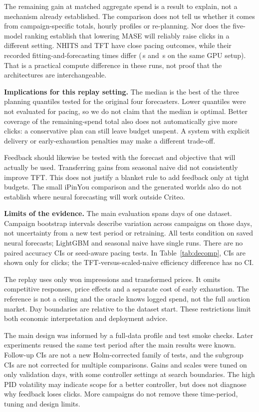\documentclass[sigconf,nonacm]{acmart}
\begin{document}
The remaining gain at matched aggregate spend is a result to explain, not a
mechanism already established. The comparison does not tell us whether it
comes from campaign-specific totals, hourly profiles or re-planning. Nor does
the five-model ranking establish that lowering MASE will reliably raise
clicks in a different setting. NHITS and TFT have close pacing outcomes,
while their recorded fitting-and-forecasting times differ
(\,s and \,s on the same GPU setup).
That is a practical compute difference in these runs, not proof that the
architectures are interchangeable.

\textbf{Implications for this replay setting.} The median is the best of the
three planning quantiles tested for the original four forecasters. Lower
quantiles were not evaluated for pacing, so we do not claim that the median
is optimal. Better coverage of the remaining-spend total also does not
automatically give more clicks: a conservative plan can still leave budget
unspent. A system with explicit delivery or early-exhaustion penalties may
make a different trade-off.

Feedback should likewise be tested with the forecast and objective that will
actually be used. Transferring gains from seasonal naive did not consistently
improve TFT. This does not justify a blanket rule to add feedback only at
tight budgets. The small iPinYou comparison and the generated worlds also
do not establish where neural forecasting will work outside Criteo.

\textbf{Limits of the evidence.} The main evaluation spans
 days of one dataset. Campaign bootstrap intervals describe
variation across campaigns on those days, not uncertainty from a new test
period or retraining. All tests condition on saved neural forecasts;
LightGBM and seasonal naive have single runs. There are no paired accuracy
CIs or seed-aware pacing tests. In Table~\ref{tab:decomp}, CIs are shown
only for clicks; the TFT-versus-scaled-naive efficiency difference has no CI.

The replay uses only won impressions and transformed prices. It omits
competitive responses, price effects and a separate cost of early exhaustion.
The reference is not a ceiling and the oracle knows logged spend, not the
full auction market. Day boundaries are relative to the dataset start.
These restrictions limit both economic interpretation and deployment advice.

The main design was informed by a full-data profile and test smoke checks.
Later experiments reused the same test period after the main results were
known. Follow-up CIs are not a new Holm-corrected family of tests, and the
subgroup CIs are not corrected for multiple comparisons. Gains and scales
were tuned on only  validation days, with some controller
settings at search boundaries. The high PID volatility may indicate scope
for a better controller, but does not diagnose why feedback loses clicks.
More campaigns do not remove these time-period, tuning and design limits.
\end{document}
